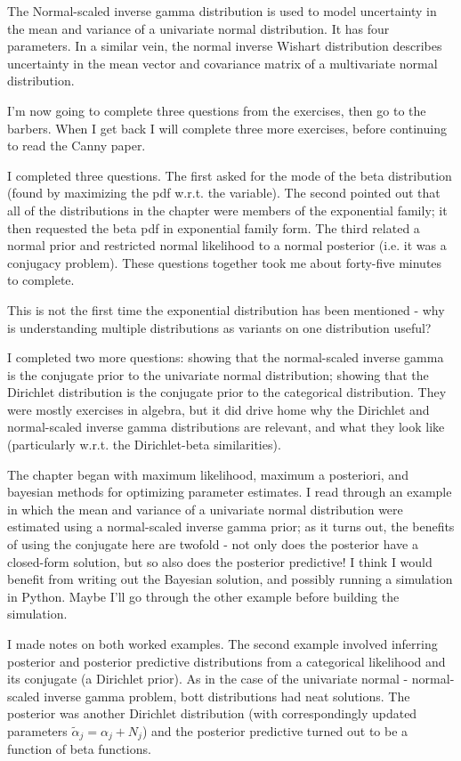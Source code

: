 \documentclass[idxtotoc,hyperref,openany]{labbook} %
\begin{document}
The Normal-scaled inverse gamma distribution is used to model uncertainty in the mean and variance of a univariate normal distribution. It has four parameters. In a similar vein, the normal inverse Wishart distribution describes uncertainty in the mean vector and covariance matrix of a multivariate normal distribution.

I'm now going to complete three questions from the exercises, then go to the barbers. When I get back I will complete three more exercises, before continuing to read the Canny paper.

I completed three questions. The first asked for the mode of the beta distribution (found by maximizing the pdf w.r.t. the variable). The second pointed out that all of the distributions in the chapter were members of the exponential family; it then requested the beta pdf in exponential family form. The third related a normal prior and restricted normal likelihood to a normal posterior (i.e. it was a conjugacy problem). These questions together took me about forty-five minutes to complete.

This is not the first time the exponential distribution has been mentioned - why is understanding multiple distributions as variants on one distribution useful?

I completed two more questions: showing that the normal-scaled inverse gamma is the conjugate prior to the univariate normal distribution; showing that the Dirichlet distribution is the conjugate prior to the categorical distribution. They were mostly exercises in algebra, but it did drive home why the Dirichlet and normal-scaled inverse gamma distributions are relevant, and what they look like (particularly w.r.t. the Dirichlet-beta similarities).

The chapter began with maximum likelihood, maximum a posteriori, and bayesian methods for optimizing parameter estimates. I read through an example in which the mean and variance of a univariate normal distribution were estimated using a normal-scaled inverse gamma prior; as it turns out, the benefits of using the conjugate here are twofold - not only does the posterior have a closed-form solution, but so also does the posterior predictive! I think I would benefit from writing out the Bayesian solution, and possibly running a simulation in Python. Maybe I'll go through the other example before building the simulation.

I made notes on both worked examples. The second example involved inferring posterior and posterior predictive distributions from a categorical likelihood and its conjugate (a Dirichlet prior). As in the case of the univariate normal - normal-scaled inverse gamma problem, bott distributions had neat solutions. The posterior was another Dirichlet distribution (with correspondingly updated parameters $\tilde{\alpha}_j = \alpha_j + N_j$) and the posterior predictive turned out to be a function of beta functions.
\end{document}
